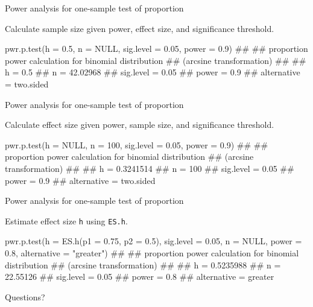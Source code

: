 \documentclass[12pt, t, xcolor=dvipsnames]{beamer}
\newcommand{\code}[1]{\colorbox{codegray}{\textcolor{black!95}{\texttt{#1}}}}
\begin{document}
\begin{frame}[fragile]{Power analysis for one-sample test of proportion}

Calculate sample size given power, effect size, and significance threshold.

\begin{Rcode}
pwr.p.test(h = 0.5, n = NULL, sig.level = 0.05, power = 0.9)
## 
##      proportion power calculation for binomial distribution 
##      (arcsine transformation) 
## 
##               h = 0.5
##               n = 42.02968
##       sig.level = 0.05
##           power = 0.9
##     alternative = two.sided
\end{Rcode}

\end{frame}

\begin{frame}[fragile]{Power analysis for one-sample test of proportion}

Calculate effect size given power, sample size, and significance threshold.

\begin{Rcode}
pwr.p.test(h = NULL, n = 100, sig.level = 0.05, power = 0.9)
## 
##      proportion power calculation for binomial distribution 
##      (arcsine transformation) 
## 
##               h = 0.3241514
##               n = 100
##       sig.level = 0.05
##           power = 0.9
##     alternative = two.sided
\end{Rcode}

\end{frame}

\begin{frame}[fragile]{Power analysis for one-sample test of proportion}

Estimate effect size \code{h} using \code{ES.h}. 

\begin{Rcode}
pwr.p.test(h = ES.h(p1 = 0.75, p2 = 0.5), sig.level = 0.05, 
           n = NULL, power = 0.8, 
           alternative = "greater")
## 
##      proportion power calculation for binomial distribution 
##      (arcsine transformation) 
## 
##               h = 0.5235988
##               n = 22.55126
##       sig.level = 0.05
##           power = 0.8
##     alternative = greater
\end{Rcode}

\end{frame}

\begin{frame}[c]
  \large{Questions?}
\end{frame}


% 
% 
% 
% 
% 
% 
% 
\end{document}

